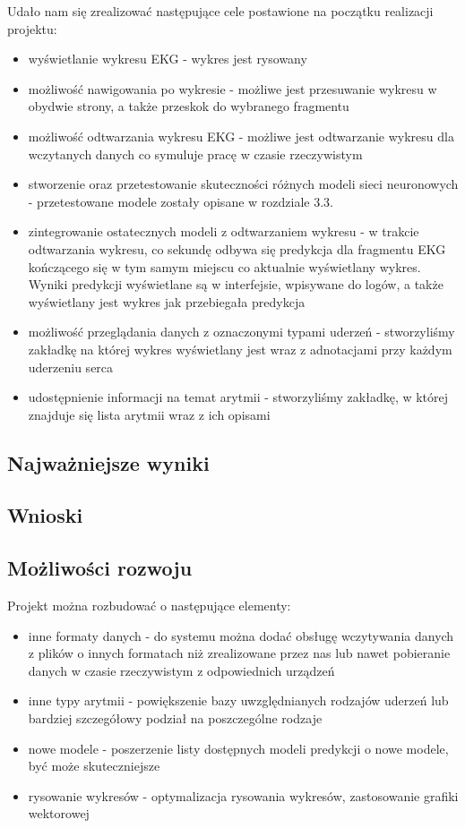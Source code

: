\documentclass[polish,12pt]{aghthesis}
\begin{document}
Udało nam się zrealizować następujące cele postawione na początku realizacji projektu:
\begin{itemize}
\item wyświetlanie wykresu EKG - wykres jest rysowany
\item możliwość nawigowania po wykresie - możliwe jest przesuwanie wykresu w obydwie strony, a także przeskok do wybranego fragmentu
\item możliwość odtwarzania wykresu EKG - możliwe jest odtwarzanie wykresu dla wczytanych danych co symuluje pracę w czasie rzeczywistym
\item stworzenie oraz przetestowanie skuteczności różnych modeli sieci neuronowych - przetestowane modele zostały opisane w rozdziale 3.3.
\item zintegrowanie ostatecznych modeli z odtwarzaniem wykresu - w trakcie odtwarzania wykresu, co sekundę odbywa się predykcja dla fragmentu EKG kończącego się w tym samym miejscu co aktualnie wyświetlany wykres. Wyniki predykcji wyświetlane są w interfejsie, wpisywane do logów, a także wyświetlany jest wykres jak przebiegała predykcja
\item możliwość przeglądania danych z oznaczonymi typami uderzeń - stworzyliśmy zakładkę na której wykres wyświetlany jest wraz z adnotacjami przy każdym uderzeniu serca 
\item udostępnienie informacji na temat arytmii - stworzyliśmy zakładkę, w której znajduje się lista arytmii wraz z ich opisami
\end{itemize}

\subsection{Najważniejsze wyniki}


\subsection{Wnioski}


\subsection{Możliwości rozwoju}

Projekt można rozbudować o następujące elementy:
\begin{itemize}
\item inne formaty danych - do systemu można dodać obsługę wczytywania danych z plików o innych formatach niż zrealizowane przez nas lub nawet pobieranie danych w czasie rzeczywistym z odpowiednich urządzeń
\item inne typy arytmii - powiększenie bazy uwzględnianych rodzajów uderzeń lub bardziej szczegółowy podział na poszczególne rodzaje
\item nowe modele - poszerzenie listy dostępnych modeli predykcji o nowe modele, być może skuteczniejsze\
\item rysowanie wykresów - optymalizacja rysowania wykresów, zastosowanie grafiki wektorowej
\end{itemize}
\end{document}
